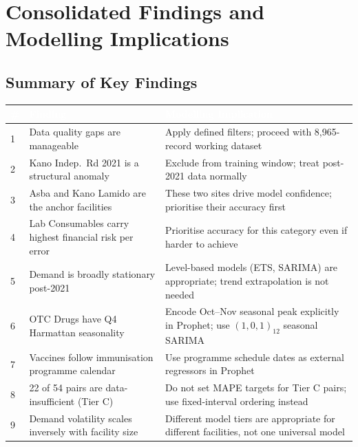 \documentclass[12pt, a4paper]{article}
\begin{document}
\section{Consolidated Findings and Modelling Implications}

\subsection{Summary of Key Findings}

\noindent
\begin{tabularx}{\textwidth}{@{} C{0.6cm} L{4.5cm} X @{}}
  \toprule
  \textcolor{white}{\textbf{\#}} &
  \textcolor{white}{\textbf{Finding}} &
  \textcolor{white}{\textbf{Modelling Implication}} \\
   & Data quality gaps are manageable & Apply defined filters; proceed with 8,965-record
      working dataset \\
  2 & Kano Indep.\ Rd 2021 is a structural anomaly & Exclude from training window;
      treat post-2021 data normally \\
  3 & Asba and Kano Lamido are the anchor facilities & These two sites drive model
      confidence; prioritise their accuracy first \\
  4 & Lab Consumables carry highest financial risk per error & Prioritise accuracy
      for this category even if harder to achieve \\
  5 & Demand is broadly stationary post-2021 & Level-based models (ETS, SARIMA) are
      appropriate; trend extrapolation is not needed \\
  6 & OTC Drugs have Q4 Harmattan seasonality & Encode Oct--Nov seasonal peak
      explicitly in Prophet; use $(1,0,1)_{12}$ seasonal SARIMA \\
  7 & Vaccines follow immunisation programme calendar & Use programme schedule dates
      as external regressors in Prophet \\
  8 & 22 of 54 pairs are data-insufficient (Tier C) & Do not set MAPE targets for
      Tier C pairs; use fixed-interval ordering instead \\
  9 & Demand volatility scales inversely with facility size & Different model tiers
      are appropriate for different facilities, not one universal model \\
  \bottomrule
\end{tabularx}
\end{document}
